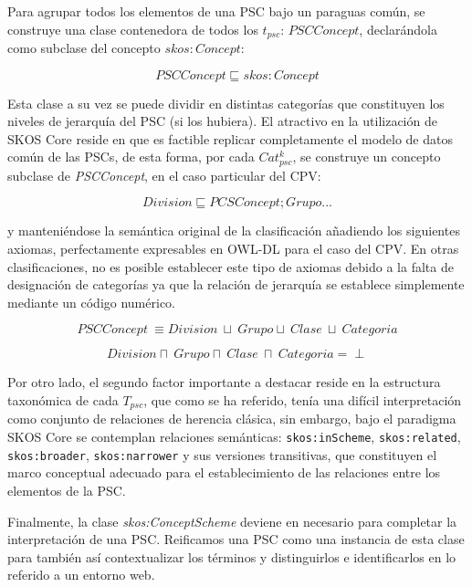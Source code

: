 Para agrupar todos los elementos de una \gls{PSC} bajo un paraguas común, se construye una
clase contenedora de todos los $t_{psc}$: $PSCConcept$, declarándola como
subclase del concepto $skos:Concept$: 

\begin{equation}
 PSCConcept \sqsubseteq skos:Concept
\end{equation}

Esta clase a su vez se puede dividir en distintas categorías que constituyen
los niveles de jerarquía del PSC (si los hubiera). El atractivo en la utilización de SKOS Core reside 
en que es factible replicar completamente el modelo de datos común de las PSCs, de esta forma, por cada $Cat_{psc}^k$,
se construye un concepto subclase de \textit{PSCConcept}, en el caso particular del \gls{CPV}:

\begin{equation}
 Division \sqsubseteq PCSConcept;Grupo \text{...}
\end{equation}

y manteniéndose la semántica original de la clasificación añadiendo los siguientes
axiomas, perfectamente expresables en OWL-DL para el caso del CPV. En otras clasificaciones, no 
es posible establecer este tipo de axiomas debido a la falta de designación de categorías ya que la 
relación de jerarquía se establece simplemente mediante un código numérico.

\begin{equation}
 PSCConcept\ \equiv Division\ \sqcup\ Grupo \sqcup\ Clase\ \sqcup\ Categoria
\end{equation}

\begin{equation}
Division \sqcap\ Grupo \sqcap\ Clase\ \sqcap\ Categoria = \perp
\end{equation}

Por otro lado, el segundo factor importante a destacar reside en la estructura taxonómica de cada
$T_{psc}$, que como se ha referido, tenía una difícil interpretación como conjunto de
relaciones de herencia clásica, sin embargo, bajo el paradigma SKOS Core se contemplan relaciones 
semánticas: \texttt{skos:inScheme}, \texttt{skos:related}, \texttt{skos:broader}, \texttt{skos:narrower} y sus versiones transitivas, que
constituyen el marco conceptual adecuado para el establecimiento de las relaciones entre los elementos de la PSC.

Finalmente, la clase \textit{skos:ConceptScheme} deviene en necesario para completar la interpretación de una PSC. 
Reificamos una PSC como una instancia de esta clase para también así contextualizar 
los términos y distinguirlos e identificarlos en lo referido a un entorno web.

